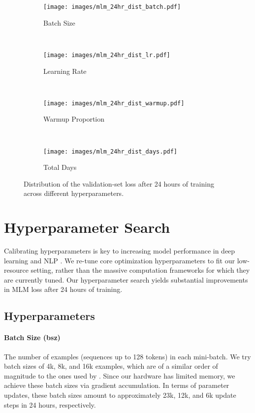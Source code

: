 \begin{figure}[ht]
    \centering
    \begin{subfigure}[b]{0.2\textwidth}
        \texttt{[image: images/mlm\_24hr\_dist\_batch.pdf]}
        \caption{Batch Size}
        \label{fig:bs_dist}
    \end{subfigure}
    ~~~~~~
    \begin{subfigure}[b]{0.2\textwidth}
        \texttt{[image: images/mlm\_24hr\_dist\_lr.pdf]}
        \caption{Learning Rate}
        \label{fig:lr_dist}
    \end{subfigure}
    \\
    \begin{subfigure}[b]{0.2\textwidth}
        \texttt{[image: images/mlm\_24hr\_dist\_warmup.pdf]}
        \caption{Warmup Proportion}
        \label{fig:warmup_proportion_dist}
    \end{subfigure}
    ~~~~~~
    \begin{subfigure}[b]{0.2\textwidth}
        \texttt{[image: images/mlm\_24hr\_dist\_days.pdf]}
        \caption{Total Days}
        \label{fig:total_day_dist}
    \end{subfigure}
\caption{Distribution of the validation-set loss after 24 hours of training across different hyperparameters.}
    \label{fig:24_hour_sweep}
\end{figure}

\section{Hyperparameter Search}
\label{sec:hyperparameters}

Calibrating hyperparameters is key to increasing model performance in deep learning and NLP \cite{levy-etal-2015-improving, Liu2019RoBERTaAR}.
We re-tune core optimization hyperparameters to fit our low-resource setting, rather than the massive computation frameworks for which they are currently tuned.
Our hyperparameter search yields substantial improvements in MLM loss after 24 hours of training.


\subsection{Hyperparameters}
\label{subsection:hyperparams}



\paragraph{Batch Size (bsz)}
The number of examples (sequences up to 128 tokens) in each mini-batch.
We try batch sizes of 4k, 8k, and 16k examples, which are of a similar order of magnitude to the ones used by \citet{Liu2019RoBERTaAR}.
Since our hardware has limited memory, we achieve these batch sizes via gradient accumulation.
In terms of parameter updates, these batch sizes amount to approximately 23k, 12k, and 6k update steps in 24 hours, respectively.

